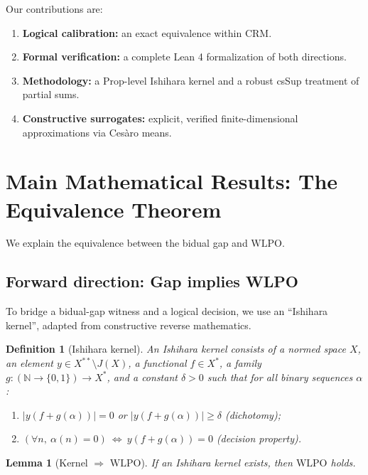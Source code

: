 \documentclass[11pt]{article}  %
\newtheorem{lemma}[theorem]{Lemma}
\newtheorem{definition}[theorem]{Definition}
\newenvironment{lem}{\begin{lemma}}{\end{lemma}}
\newenvironment{defi}{\begin{definition}}{\end{definition}}
\newtheorem{lemma}[theorem]{Lemma}
\newtheorem{definition}[theorem]{Definition}
\newenvironment{lem}{\begin{lemma}}{\end{lemma}}
\newenvironment{defi}{\begin{definition}}{\end{definition}}
\newcommand{\N}{\mathbb{N}}
\newcommand{\WLPO}{\mathrm{WLPO}}
\newcommand{\CRM}{\mathrm{CRM}}
\begin{document}
Our contributions are:
\begin{enumerate}[label=\arabic*.]
\item \textbf{Logical calibration:} an exact equivalence within $\CRM$.
\item \textbf{Formal verification:} a complete Lean 4 formalization of both directions.
\item \textbf{Methodology:} a Prop-level Ishihara kernel and a robust csSup treatment of partial sums.
\item \textbf{Constructive surrogates:} explicit, verified finite-dimensional approximations via Ces\`aro means.
\end{enumerate}

\section{Main Mathematical Results: The Equivalence Theorem}

We explain the equivalence between the bidual gap and $\WLPO$.

\subsection{Forward direction: Gap implies WLPO}

To bridge a bidual-gap witness and a logical decision, we use an ``Ishihara kernel'', adapted from constructive reverse mathematics.

\begin{defi}[Ishihara kernel]
An Ishihara kernel consists of a normed space $X$, an element $y\in X^{**}\setminus J(X)$, a functional $f\in X^*$, a family $g:(\N\to\{0,1\})\to X^*$, and a constant $\delta>0$ such that for all binary sequences $\alpha$:
\begin{enumerate}
\item $|y(f+g(\alpha))|=0$ or $|y(f+g(\alpha))|\ge \delta$ (dichotomy);
\item $(\forall n,\ \alpha(n)=0)\ \Leftrightarrow\ y(f+g(\alpha))=0$ (decision property).
\end{enumerate}
\end{defi}

\begin{lem}[Kernel $\Rightarrow$ $\WLPO$]
If an Ishihara kernel exists, then $\WLPO$ holds.
\end{lem}
\end{document}
